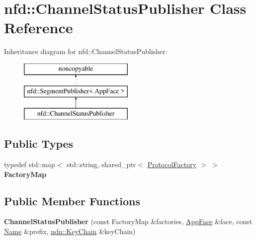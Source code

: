 \hypertarget{classnfd_1_1ChannelStatusPublisher}{}\section{nfd\+:\+:Channel\+Status\+Publisher Class Reference}
\label{classnfd_1_1ChannelStatusPublisher}
Inheritance diagram for nfd\+:\+:Channel\+Status\+Publisher\+:\begin{figure}[H]
\begin{center}
\leavevmode
\includegraphics[height=3.000000cm]{classnfd_1_1ChannelStatusPublisher}
\end{center}
\end{figure}
\subsection*{Public Types}
\begin{DoxyCompactItemize}
\item 
typedef std\+::map$<$ std\+::string, shared\+\_\+ptr$<$ \hyperlink{classnfd_1_1ProtocolFactory}{Protocol\+Factory} $>$ $>$ {\bfseries Factory\+Map}\hypertarget{classnfd_1_1ChannelStatusPublisher_a7ec866622585c7f50410414a538c17cc}{}\label{classnfd_1_1ChannelStatusPublisher_a7ec866622585c7f50410414a538c17cc}

\end{DoxyCompactItemize}
\subsection*{Public Member Functions}
\begin{DoxyCompactItemize}
\item 
{\bfseries Channel\+Status\+Publisher} (const Factory\+Map \&factories, \hyperlink{classnfd_1_1AppFace}{App\+Face} \&face, const \hyperlink{classndn_1_1Name}{Name} \&prefix, \hyperlink{classndn_1_1security_1_1KeyChain}{ndn\+::\+Key\+Chain} \&key\+Chain)\hypertarget{classnfd_1_1ChannelStatusPublisher_a7bd1ade1cbd4f66155f2255fad50018f}{}\label{classnfd_1_1ChannelStatusPublisher_a7bd1ade1cbd4f66155f2255fad50018f}

\end{DoxyCompactItemize}
